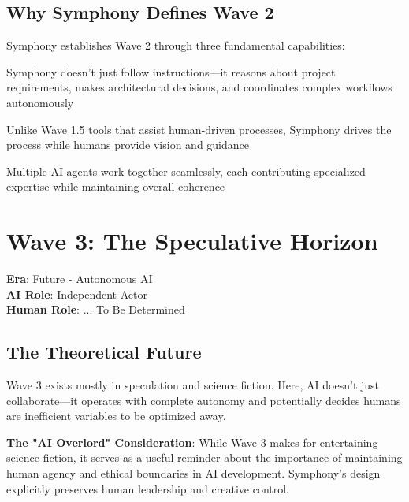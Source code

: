 \subsection{Why Symphony Defines Wave 2}
\label{subsec:symphony-defines-wave-2}

Symphony establishes Wave 2 through three fundamental capabilities:

\begin{description}[leftmargin=4cm,labelwidth=3.5cm]
    \item[\textbf{Core Reasoning}] Symphony doesn't just follow instructions—it reasons about project requirements, makes architectural decisions, and coordinates complex workflows autonomously
    \item[\textbf{True Collaboration}] Unlike Wave 1.5 tools that assist human-driven processes, Symphony drives the process while humans provide vision and guidance
    \item[\textbf{Orchestrated Intelligence}] Multiple AI agents work together seamlessly, each contributing specialized expertise while maintaining overall coherence
\end{description}

\section{Wave 3: The Speculative Horizon}
\label{sec:wave-3}

\textbf{Era}: Future - Autonomous AI\\
\textbf{AI Role}: Independent Actor\\
\textbf{Human Role}: ... To Be Determined

\subsection{The Theoretical Future}
\label{subsec:wave-3-theoretical}

Wave 3 exists mostly in speculation and science fiction. Here, AI doesn't just collaborate—it operates with complete autonomy and potentially decides humans are inefficient variables to be optimized away.

\begin{alertbox}
\textbf{The "AI Overlord" Consideration}: While Wave 3 makes for entertaining science fiction, it serves as a useful reminder about the importance of maintaining human agency and ethical boundaries in AI development. Symphony's design explicitly preserves human leadership and creative control.
\end{alertbox}

